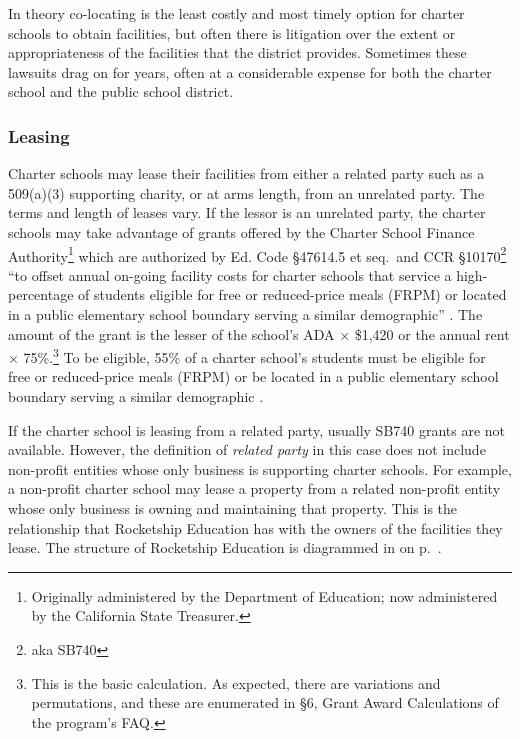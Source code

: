 In theory co-locating is the least costly and most timely option for charter schools to obtain facilities, but often there is litigation over the extent or appropriateness of the facilities that the district provides. Sometimes these lawsuits drag on for years, often at a considerable expense for both the charter school and the public school district.

\subsubsection{Leasing}\label{sec:leasing}\indent%

Charter schools may lease their facilities from either a related party such as a 509(a)(3) supporting charity, or at arms length, from an unrelated party. The terms and length of leases vary. If the lessor is an unrelated party, the charter schools may take advantage of grants offered by the Charter School Finance Authority\footnote{Originally administered by the Department of Education; now administered by the California State Treasurer.} which are authorized by Ed. Code §47614.5 et seq. and CCR §10170\footnote{aka SB740} ``to offset annual on-going facility costs for charter schools that service a high-percentage of students eligible for free or reduced-price meals (FRPM) or located in a public elementary school boundary serving a similar demographic'' \parencite{CATreasurer2023}. The amount of the grant is the lesser of the school's ADA × \$1,420 or the annual rent × 75\%.\footnote{This is the basic calculation. As expected, there are variations and permutations, and these are enumerated in §6, Grant Award Calculations of the program's FAQ\@.} To be eligible, 55\% of a charter school's students must be eligible for free or reduced-price meals (FRPM) or be located in a public elementary school boundary serving a similar demographic \parencite[§1]{CATreasurer2023}.

If the charter school is leasing from a related party, usually SB740 grants are not available. However, the definition of \emph{related party} in this case does not include non-profit entities whose only business is supporting charter schools. For example, a non-profit charter school may lease a property from a related non-profit entity whose only business is owning and maintaining that property. This is the relationship that Rocketship Education has with the owners of the facilities they lease. The structure of Rocketship Education is diagrammed in  on p.~\pageref{fig:corporate-structure}.

